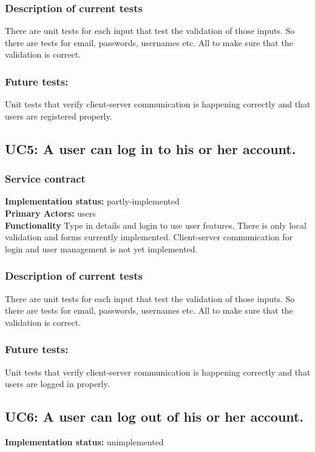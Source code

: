 \documentclass[12pt]{article}
\begin{document}
{	\subsubsection{Description of current tests}
	There are unit tests for each input that test the validation of those inputs. So there are tests for email, passwords, usernames etc. All to make sure that the validation is correct.
	\subsubsection{Future tests:}
	Unit tests that verify client-server communication is happening correctly and that users are registered properly.



	\subsection{UC5: A user can log in to his or her account.}
	\subsubsection{Service contract}
	\textbf{Implementation status:} partly-implemented \\
	\textbf{Primary Actors:} users \\
	\textbf{Functionality} Type in details and login to use user features. There is only local validation and forms currently implemented. Client-server communication for login and user management is not yet implemented. \\
	\subsubsection{Description of current tests}
	There are unit tests for each input that test the validation of those inputs. So there are tests for email, passwords, usernames etc. All to make sure that the validation is correct.
	\subsubsection{Future tests:}
	Unit tests that verify client-server communication is happening correctly and that users are logged in properly.

	\subsection{UC6: A user can log out of his or her account.}
	\textbf{Implementation status:} unimplemented \\

}
\end{document}
